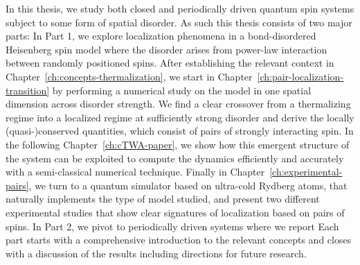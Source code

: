

In this thesis, we study both closed and periodically driven quantum spin systems subject to some form of spatial disorder. As such this thesis consists of two major parts: 
In Part 1, we explore localization phenomena in a bond-disordered Heisenberg spin model where the disorder arises from power-law interaction between randomly positioned spins. After establishing the relevant context in Chapter~\ref{ch:concepts-thermalization}, we start in Chapter~\ref{ch:pair-localization-transition} by performing a numerical study on the model in one spatial dimension across disorder strength. We find a clear crossover from a thermalizing regime into a localized regime at sufficiently strong disorder and derive the locally (quasi-)conserved quantities, which consist of pairs of strongly interacting spin. In the following Chapter~\ref{ch:cTWA-paper}, we show how this emergent structure of the system can be exploited to compute the dynamics efficiently and accurately with a semi-classical numerical technique. Finally in Chapter~\ref{ch:experimental-pairs}, we turn to a quantum simulator based on ultra-cold Rydberg atoms, that naturally implements the type of model studied, and present two different experimental studies that show clear signatures of localization based on pairs of spins.
In Part 2, we pivot to periodically driven systems where we report 
Each part starts with a comprehensive introduction to the relevant concepts and closes with a discussion of the results including directions for future research.



